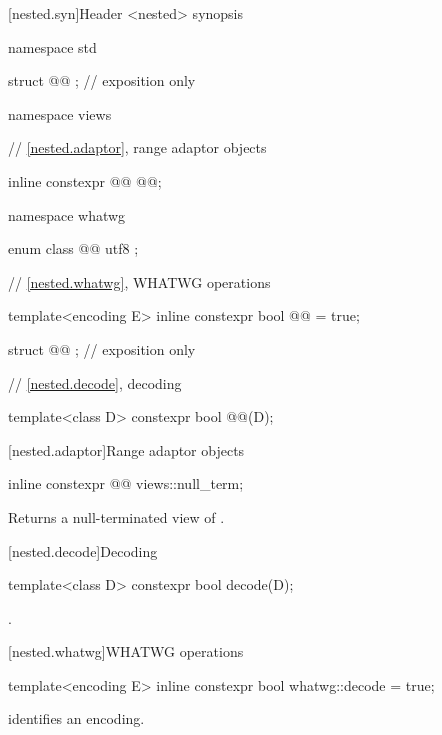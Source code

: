 [nested.syn]{Header <nested> synopsis}

\begin{codeblock}
namespace std {
  struct @@ {}; // exposition only

  namespace views {
    // \ref{nested.adaptor}, range adaptor objects

    inline constexpr @@ @@;
  }

  namespace whatwg {
    enum class @@ { utf8 };

    // \ref{nested.whatwg}, WHATWG operations

    template<encoding E> inline constexpr bool @@ = true;

    struct @@ {}; // exposition only
  }

  // \ref{nested.decode}, decoding

  template<class D> constexpr bool @@(D);
}
\end{codeblock}

[nested.adaptor]{Range adaptor objects}

%
\begin{itemdecl}
inline constexpr @@ views::null_term;
\end{itemdecl}

\begin{itemdescr}
\pnum
\effects
Returns a null-terminated view of .
\end{itemdescr}

[nested.decode]{Decoding}

%
\begin{itemdecl}
template<class D> constexpr bool decode(D);
\end{itemdecl}

\begin{itemdescr}
\pnum
\returns
{}.
\end{itemdescr}

[nested.whatwg]{WHATWG operations}

%
\begin{itemdecl}
template<encoding E> inline constexpr bool whatwg::decode = true;
\end{itemdecl}

\begin{itemdescr}
\pnum
\remarks
{} identifies an encoding.
\end{itemdescr}
